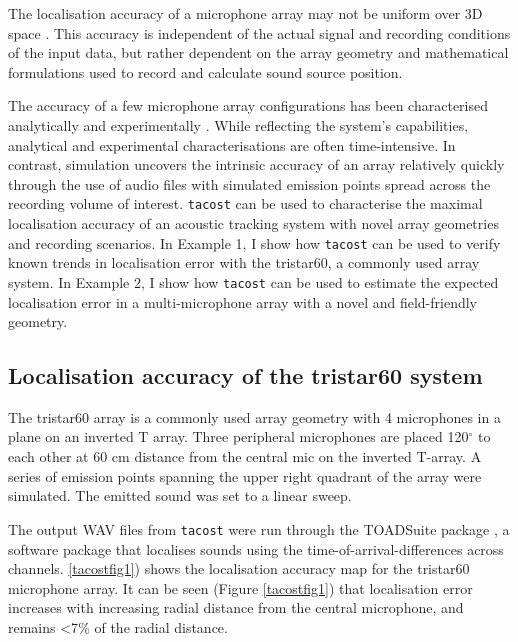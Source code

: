 \documentclass[
]{book}
\begin{document}
The localisation accuracy of a microphone array may not be uniform over 3D space \citep{aubauer1996acoustical, Wahlberg1999}. This accuracy is independent of the actual signal and recording conditions of the input data, but rather dependent on the array geometry and mathematical formulations used to record and calculate sound source position.

The accuracy of a few microphone array configurations has been characterised analytically \citep{aubauer1996acoustical} and experimentally \citep{Wahlberg1999}. While reflecting the system's capabilities, analytical
and experimental characterisations are often time-intensive. In contrast, simulation uncovers the intrinsic accuracy of an array relatively quickly through the use of audio files with simulated emission points spread across the recording volume of interest.
\texttt{tacost} can be used to characterise the maximal localisation accuracy of an acoustic tracking system with novel array geometries and recording scenarios. In Example 1, I show how \texttt{tacost} can be used to verify known trends in
localisation error with the tristar60, a commonly used array system. In Example 2, I show how \texttt{tacost} can be used to estimate the expected localisation error in a multi-microphone array with a novel and field-friendly geometry.

\hypertarget{localisation-accuracy-of-the-tristar60-system}{%
\subsection{Localisation accuracy of the tristar60 system}\label{localisation-accuracy-of-the-tristar60-system}}

The tristar60 array is a commonly used array geometry \citep{aubauer1996acoustical, Holderied20032293, Hugel2017, Lewanzik2018} with 4 microphones in a plane on an inverted T array. Three peripheral microphones are placed 120\(^{\circ}\) to
each other at 60 cm distance from the central mic on the inverted T-array. A series of emission points spanning the upper right quadrant of the array were simulated. The emitted sound was set to a linear sweep.

The output WAV files from \texttt{tacost} were run through the TOADSuite package \citep{holger_toadsuite_manual, toadsuite_peterstilz, Hugel2017, Lewanzik2018}, a software package that localises sounds using the time-of-arrival-differences across channels. \ref{tacostfig1}) shows the localisation accuracy map
for the tristar60 microphone array. It can be seen (Figure \ref{tacostfig1}) that localisation error increases with increasing radial distance from the central microphone, and remains \textless7\(\%\) of the radial distance.
\end{document}
